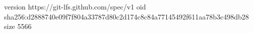 version https://git-lfs.github.com/spec/v1
oid sha256:d2888740e09f7f804a33787d80c2d174c8c84a77145492f611aa78b3c498db28
size 5566
